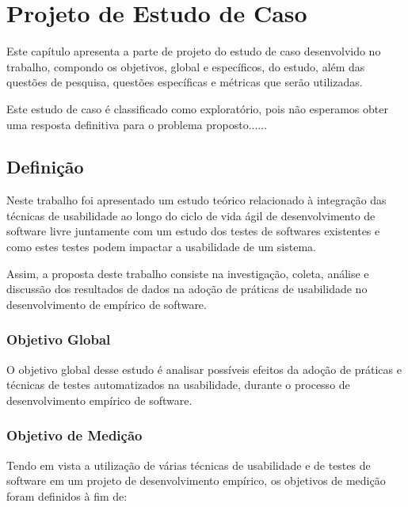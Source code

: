 \chapter{Projeto de Estudo de Caso}


Este capítulo apresenta a parte de projeto do estudo de caso desenvolvido no trabalho, compondo os objetivos, global e específicos, do estudo, além das questões de pesquisa, questões específicas e métricas que serão utilizadas.


Este estudo de caso é classificado como exploratório, pois não esperamos obter uma resposta definitiva para o problema proposto......

\section{Definição}
Neste trabalho foi apresentado um estudo teórico relacionado à integração das técnicas de usabilidade ao longo do ciclo de vida ágil de desenvolvimento de software livre juntamente com um estudo dos testes de softwares existentes e como estes testes podem impactar a usabilidade de um sistema.

Assim, a proposta deste trabalho consiste na investigação, coleta, análise e discussão dos resultados de dados na adoção de práticas de usabilidade no desenvolvimento de empírico de software.

\subsection{Objetivo Global}

O objetivo global desse estudo é analisar possíveis efeitos da adoção de práticas e técnicas de testes automatizados na usabilidade, durante o processo de desenvolvimento empírico de software.

\subsection{Objetivo de Medição}

Tendo em vista a utilização de várias técnicas de usabilidade e de testes de software em um projeto de desenvolvimento empírico, os objetivos de medição foram definidos à fim de:


